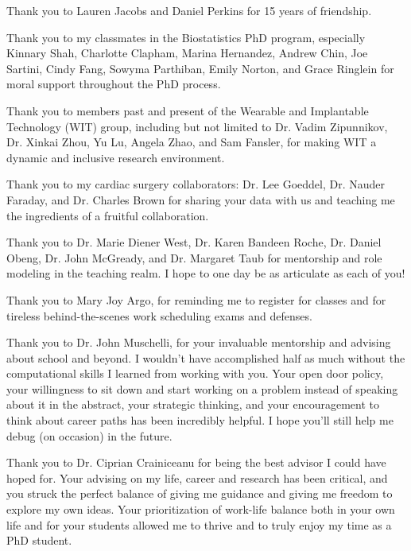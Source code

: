 Thank you to Lauren Jacobs and Daniel Perkins for 15 years of friendship. 

Thank you to my classmates in the Biostatistics PhD program, especially Kinnary Shah, Charlotte Clapham, Marina Hernandez, Andrew Chin, Joe Sartini, Cindy Fang, Sowyma Parthiban, Emily Norton, and Grace Ringlein for moral support throughout the PhD process. 

Thank you to members past and present of the Wearable and Implantable Technology (WIT) group, including but not limited to Dr. Vadim Zipunnikov, Dr. Xinkai Zhou, Yu Lu, Angela Zhao, and Sam Fansler, for making WIT a dynamic and inclusive research environment. 

Thank you to my cardiac surgery collaborators: Dr. Lee Goeddel, Dr. Nauder Faraday, and Dr. Charles Brown for sharing your data with us and teaching me the ingredients of a fruitful collaboration.

Thank you to Dr. Marie Diener West, Dr. Karen Bandeen Roche, Dr. Daniel Obeng, Dr. John McGready, and Dr. Margaret Taub for mentorship and role modeling in the teaching realm. I hope to one day be as articulate as each of you! 

Thank you to Mary Joy Argo, for reminding me to register for classes and for tireless behind-the-scenes work scheduling exams and defenses. 

Thank you to Dr. John Muschelli, for your invaluable mentorship and advising about school and beyond. I wouldn't have accomplished half as much without the computational skills I learned from working with you. Your open door policy, your willingness to sit down and start working on a problem instead of speaking about it in the abstract, your strategic thinking, and your encouragement to think about career paths has been incredibly helpful. I hope you'll still help me debug (on occasion) in the future. 

Thank you to Dr. Ciprian Crainiceanu for being the best advisor I could have hoped for. Your advising on my life, career and research has been critical, and you struck the perfect balance of giving me guidance and giving me freedom to explore my own ideas. Your prioritization of work-life balance both in your own life and for your students allowed me to thrive and to truly enjoy my time as a PhD student. 



